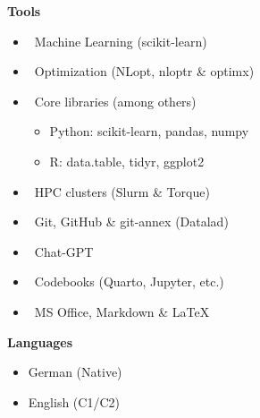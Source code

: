 \documentclass[10pt,a4paper,ragged2e,withhyper]{altacv}
\begin{document}
\begin{paracol}{2}
\bfseries\textcolor{emphasis}{Tools}\\
\vspace{0.8em}
\begin{itemize}[label={}, left=0pt, itemsep=5pt, topsep=0pt]
    \item \faLayerGroup{}\ Machine Learning \textnormal{(scikit-learn)}
    \item \faBullseye{}\ Optimization \textnormal{(NLopt, nloptr \& optimx)}
    \item \faBoxes{}\ Core libraries \textnormal{(among others)}
    \begin{itemize}[left=7pt, itemsep=2pt, topsep=2pt]
        \item Python: \textnormal{scikit-learn, pandas, numpy}
        \item R: \textnormal{data.table, tidyr, ggplot2}
    \end{itemize}
    \item \faServer{}\ HPC clusters (\textnormal{Slurm \& Torque)}
    \item \faGit*{}\ Git, GitHub \& git-annex \textnormal{(Datalad)}
    \item \faLaptop{}\ Chat-GPT
    \item \faBook{}\ Codebooks \textnormal{(Quarto, Jupyter, etc.)}
    \item \faPencil*{}\ MS Office, Markdown \& LaTeX
\end{itemize}
\divider{}
\bfseries\textcolor{emphasis}{Languages}
\vspace{1ex}
\begin{itemize}
    \item German (Native)
    \item English (C1/C2)
\end{itemize}
\vspace{0.5ex}


\end{paracol}
\end{document}
